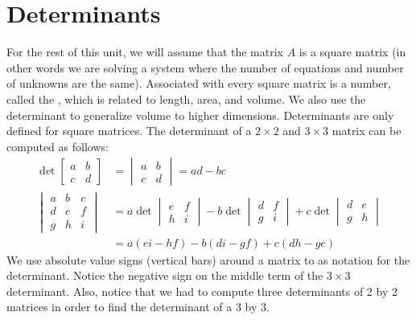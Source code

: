 {\section{Determinants}
For the rest of this unit, we will assume that the matrix $A$ is a square matrix (in other words we are solving a system where the number of equations and number of unknowns are the same).
Associated with every square matrix is a number, called the , which is related to length, area, and volume.  We also use the determinant to generalize volume to higher dimensions. Determinants are only defined for square matrices.
The determinant of a {$2\times 2$} and {$3\times 3$} matrix can be computed as follows: 
\begin{align*}
\det\begin{bmatrix}a&b\\c&d\end{bmatrix} &=\begin{vmatrix}a&b\\c&d\end{vmatrix} = ad-bc\\
\begin{vmatrix}a&b&c\\d&e&f\\g&h&i\end{vmatrix} &= a\det\begin{vmatrix}e&f\\h&i\end{vmatrix} -b\det\begin{vmatrix}d&f\\g&i\end{vmatrix} +c\det\begin{vmatrix}d&e\\g&h\end{vmatrix}\\
&=a(ei-hf)-b(di-gf)+c(dh-ge)
\end{align*}
We use absolute value signs (vertical bars) around a matrix to as notation for the determinant. Notice the negative sign on the middle term of the {$3 \times 3$} determinant. Also, notice that we had to compute three determinants of 2 by 2 matrices in order to find the determinant of a 3 by 3.  

}
